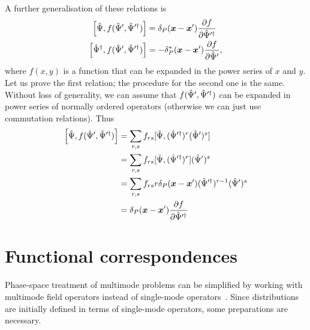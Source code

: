 A further generalisation of these relations is
\begin{equation}
\label{eqn:multimode-formalism:functional-commutators}
\begin{split}
	\left[ \hat{\Psi}, f( \hat{\Psi}^\prime, \hat{\Psi}^{\prime\dagger} ) \right]
	& = \delta_P (\boldsymbol{x} - \boldsymbol{x}^\prime) \frac{\partial f}{\partial \hat{\Psi}^{\prime\dagger}} \\
	\left[ \hat{\Psi}^\dagger, f( \hat{\Psi}^\prime, \hat{\Psi}^{\prime\dagger} ) \right]
	& = -\delta_P^* (\boldsymbol{x} - \boldsymbol{x}^\prime) \frac{\partial f}{\partial \hat{\Psi}^\prime},
\end{split}
\end{equation}
where $f(x, y)$ is a function that can be expanded in the power series of $x$ and $y$.
Let us prove the first relation; the procedure for the second one is the same.
Without loss of generality, we can assume that $f(\hat{\Psi}^\prime, \hat{\Psi}^{\prime\dagger})$ can be expanded in power series of normally ordered operators (otherwise we can just use commutation relations).
Thus
\begin{equation*}
\begin{split}
	\left[ \hat{\Psi}, f( \hat{\Psi}^\prime, \hat{\Psi}^{\prime\dagger} ) \right]
	& = \sum\limits_{r,s} f_{rs} [ \hat{\Psi}, (\hat{\Psi}^{\prime\dagger})^r (\hat{\Psi}^\prime)^s ] \\
	& = \sum\limits_{r,s} f_{rs} [ \hat{\Psi}, (\hat{\Psi}^{\prime\dagger})^r ] (\hat{\Psi}^\prime)^s \\
	& = \sum\limits_{r,s} f_{rs} r \delta_P(\boldsymbol{x} - \boldsymbol{x}^\prime)
		(\hat{\Psi}^{\prime\dagger})^{r-1} (\hat{\Psi}^\prime)^s \\
	& = \delta_P (\boldsymbol{x} - \boldsymbol{x}^\prime) \frac{\partial f}{\partial \hat{\Psi}^{\prime\dagger}}
\end{split}
\end{equation*}


\section{Functional correspondences}

Phase-space treatment of multimode problems can be simplified by working with multimode field operators instead of single-mode operators~\cite{Steel1998,Norrie2006a}.
Since distributions are initially defined in terms of single-mode operators, some preparations are necessary.

